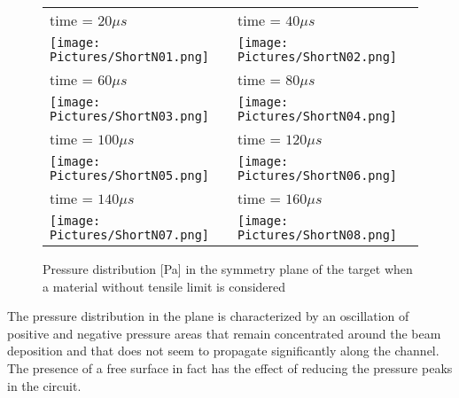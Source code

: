 \documentclass[a4paper, 11pt, twocolumn]{article}
\begin{document}
\begin{figure*}[t]
\centering
\begin{tabular}{|l|l|}
\hline
\small time = $20 \mu s$ & \small time = $40 \mu s$ \\
\texttt{[image: Pictures/ShortN01.png]} &
\texttt{[image: Pictures/ShortN02.png]} \\
\hline
\small time = $60 \mu s$ & \small time = $80 \mu s$ \\
\texttt{[image: Pictures/ShortN03.png]} &
\texttt{[image: Pictures/ShortN04.png]} \\
\hline
\small time = $100 \mu s$ & \small time = $120 \mu s$ \\
\texttt{[image: Pictures/ShortN05.png]} &
\texttt{[image: Pictures/ShortN06.png]} \\
\hline
\small time = $140 \mu s$ & \small time = $160 \mu s$ \\
\texttt{[image: Pictures/ShortN07.png]} &
\texttt{[image: Pictures/ShortN08.png]} \\
\hline
\end{tabular}
\caption{Pressure distribution [Pa] in the symmetry plane of the target when a material without tensile limit is considered}
\label{fig:pressure}
\end{figure*}

The pressure distribution in the plane is characterized by an oscillation of positive and negative pressure areas that remain concentrated around the beam deposition and that does not seem to propagate significantly along the channel. The presence of a free surface in fact has the effect of reducing the pressure peaks in the circuit. 
\end{document}
